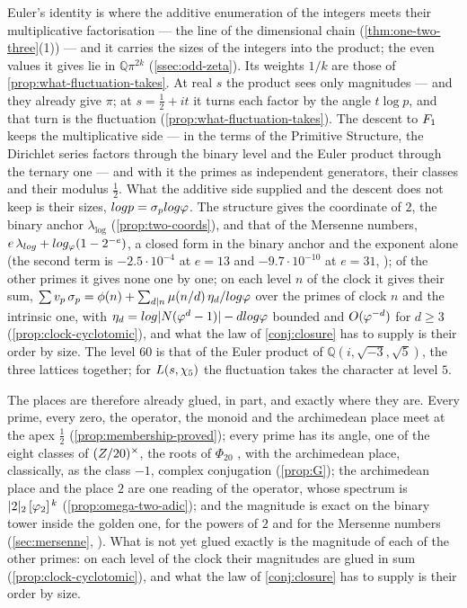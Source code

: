Euler's identity is where the additive enumeration of the integers meets their multiplicative
factorisation --- the line of the dimensional chain (\cref{thm:one-two-three}(1)) --- and it carries
the sizes of the integers into the product; the even values it gives lie in $\mathbb{Q}\pi^{2k}$
(\cref{ssec:odd-zeta}).  Its weights $1/k$ are those of \cref{prop:what-fluctuation-takes}.  At real $s$ the product
sees only magnitudes --- and they already give $\pi$; at $s=\tfrac12+it$ it turns each factor by the
angle $t\log p$, and that turn is the fluctuation (\cref{prop:what-fluctuation-takes}).  The descent to $F_1$ keeps
the multiplicative side --- in the terms of the Primitive Structure, the Dirichlet series factors through the binary
level and the Euler product through the ternary one \cite{gonzalez25hp} --- and with it the primes as
independent generators, their classes and their modulus $\tfrac12$.  What the additive side supplied
and the descent does not keep is their sizes, $log p=\sigma_plog\varphi$.  The structure gives the coordinate of $2$, the binary anchor $\lambda_{\log}$ (\cref{prop:two-coords}), and that of the Mersenne numbers, $e\,\lambda_{log}+log_\varphi(1-2^{-e})$, a closed form in the binary anchor and the exponent alone
(the second term is $-2.5\cdot10^{-4}$ at $e=13$ and $-9.7\cdot10^{-10}$ at $e=31$, ); of the other primes it gives none one by one; on each
level $n$ of the clock it gives their sum,
$\sum v_p\,\sigma_p=\phi(n)+\sum_{d\mid n}
\mu(n/d)\,\eta_d/log\varphi$ over the primes of
clock $n$ and the intrinsic one, with
$\eta_d=log|N(\varphi^d-1)|-dlog\varphi$ bounded and
$O(\varphi^{-d})$ for $d\ge3$
(\cref{prop:clock-cyclotomic}), and what the law of
\cref{conj:closure} has to supply is their order by
size.  The
level $60$ is that of the Euler product of $\mathbb{Q}(i,\sqrt{-3},\sqrt5)$, the three lattices together;
for $L(s,\chi_5)$ the fluctuation takes the character at level $5$.

The places are therefore already glued, in part, and exactly where they are.  Every prime, every
zero, the operator, the monoid and the archimedean place meet at the apex $\tfrac12$
(\cref{prop:membership-proved}); every prime has its angle, one of the eight classes of $(Z/20)^{\times}$, the
roots of $\Phi_{20}$ \cite{grisales25}, with the archimedean place, classically, as the class $-1$, complex conjugation (\cref{prop:G}); the archimedean place and the place $2$ are one reading of the operator,
whose spectrum is $|2|_2\,[\varphi_2]^{\,k}$ (\cref{prop:omega-two-adic}); and the magnitude is exact on the
binary tower inside the golden one, for the powers of $2$ and for the Mersenne numbers
(\cref{sec:mersenne}, \cite{acevedo20,acevedo21}).  What
is not yet glued exactly is the magnitude of each of the
other primes: on each level of the clock their
magnitudes are glued in sum
(\cref{prop:clock-cyclotomic}), and what the law of
\cref{conj:closure} has to supply is their order by
size.


